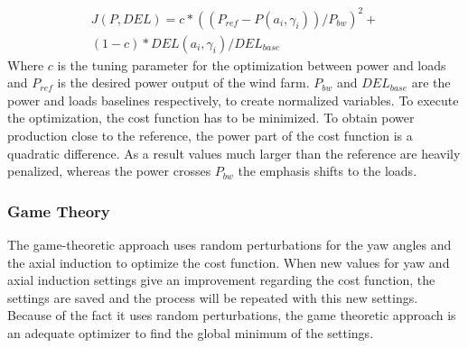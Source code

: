 \begin{equation}
\begin{aligned}
J(P,DEL) = c*((P_{ref}-P(a_i,\gamma_i))/P_{bw})^2  + \\
(1-c)*DEL(a_i,\gamma_i)/DEL_{base}
\end{aligned}
 \label{eq:costf}
\end{equation}
Where $c$ is the tuning parameter for the optimization between power and loads and $P_{ref}$ is the desired power output of the wind farm. $P_{bw}$ and $DEL_{base}$ are the power and loads baselines respectively, to create normalized variables.
\newline
To execute the optimization, the cost function has to be minimized. To obtain power production close to the reference, the power part of the cost function is a quadratic difference. As a result values much larger than the reference are heavily penalized, whereas the power crosses $P_{bw}$ the emphasis shifts to the loads.

\subsubsection{Game Theory}
The game-theoretic approach uses random perturbations for the yaw angles and the axial induction to optimize the cost function. When new values for yaw and axial induction settings give an improvement regarding the cost function, the settings are saved and the process will be repeated with this new settings. Because of the fact it uses random perturbations, the game theoretic approach is an adequate optimizer to find the global minimum of the settings.\cite{Dijk2016}




